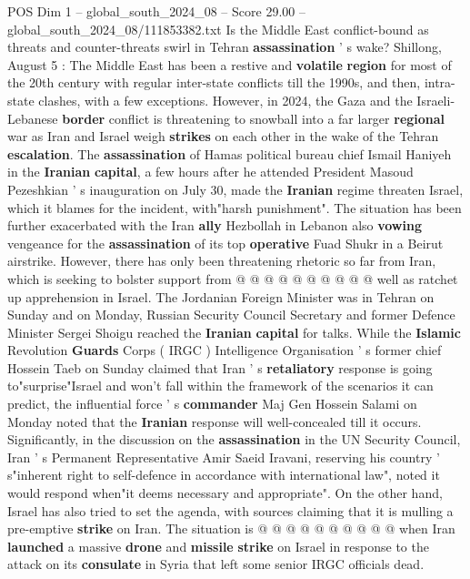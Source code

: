 \begin{textsample}{POS Dim 1 – global\_south\_2024\_08 – Score 29.00 – global\_south\_2024\_08/111853382.txt}  \label{ex:f1_pos_012}
Is the Middle East conflict-bound as threats and counter-threats swirl in Tehran \textbf{assassination} ' s wake?
Shillong, August 5 : The Middle East has been a restive and \textbf{volatile} \textbf{region} for most of the 20th century with regular inter-state conflicts till the 1990s, and then, intra-state clashes, with a few exceptions.
However, in 2024, the Gaza and the Israeli-Lebanese \textbf{border} conflict is threatening to snowball into a far larger \textbf{regional} war as Iran and Israel weigh \textbf{strikes} on each other in the wake of the Tehran \textbf{escalation}.
The \textbf{assassination} of Hamas political bureau chief Ismail Haniyeh in the \textbf{Iranian} \textbf{capital}, a few hours after he attended President Masoud Pezeshkian ' s inauguration on July 30, made the \textbf{Iranian} regime threaten Israel, which it blames for the incident, with"harsh punishment".
The situation has been further exacerbated with the Iran \textbf{ally} Hezbollah in Lebanon also \textbf{vowing} vengeance for the \textbf{assassination} of its top \textbf{operative} Fuad Shukr in a Beirut airstrike.
However, there has only been threatening rhetoric so far from Iran, which is seeking to bolster support from @ @ @ @ @ @ @ @ @ @ well as ratchet up apprehension in Israel.
The Jordanian Foreign Minister was in Tehran on Sunday and on Monday, Russian Security Council Secretary and former Defence Minister Sergei Shoigu reached the \textbf{Iranian} \textbf{capital} for talks.
While the \textbf{Islamic} Revolution \textbf{Guards} Corps ( IRGC ) Intelligence Organisation ' s former chief Hossein Taeb on Sunday claimed that Iran ' s \textbf{retaliatory} response is going to"surprise"Israel and won't fall within the framework of the scenarios it can predict, the influential force ' s \textbf{commander} Maj Gen Hossein Salami on Monday noted that the \textbf{Iranian} response will well-concealed till it occurs.
Significantly, in the discussion on the \textbf{assassination} in the UN Security Council, Iran ' s Permanent Representative Amir Saeid Iravani, reserving his country ' s"inherent right to self-defence in accordance with international law", noted it would respond when"it deems necessary and appropriate".
On the other hand, Israel has also tried to set the agenda, with sources claiming that it is mulling a pre-emptive \textbf{strike} on Iran.
The situation is @ @ @ @ @ @ @ @ @ @ when Iran \textbf{launched} a massive \textbf{drone} and \textbf{missile} \textbf{strike} on Israel in response to the attack on its \textbf{consulate} in Syria that left some senior IRGC officials dead.

\end{textsample}

